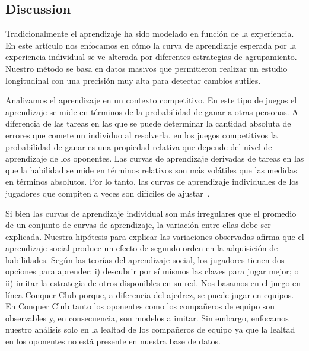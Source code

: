 \documentclass[a4paper,10pt]{book}
\theoremstyle{definition}
\begin{document}
\subsection{Discussion}

Tradicionalmente el aprendizaje ha sido modelado en funci\'on de la experiencia.
%
En este art\'iculo nos enfocamos en c\'omo la curva de aprendizaje esperada por la experiencia individual se ve alterada por diferentes estrategias de agrupamiento.
%
Nuestro método se basa en datos masivos que permitieron realizar un estudio longitudinal con una precisi\'on muy alta para detectar cambios sutiles.


Analizamos el aprendizaje en un contexto competitivo.
%
En este tipo de juegos el aprendizaje se mide en términos de la probabilidad de ganar a otras personas.
%
A diferencia de las tareas en las que se puede determinar la cantidad absoluta de errores que comete un individuo al resolverla, en los juegos competitivos la probabilidad de ganar es una propiedad relativa que depende del nivel de aprendizaje de los oponentes.
%
Las curvas de aprendizaje derivadas de tareas en las que la habilidad se mide en términos relativos son más volátiles que las medidas en términos absolutos.
%
Por lo tanto, las curvas de aprendizaje individuales de los jugadores que compiten a veces son dif\'iciles de ajustar~\cite{howard2014-learningCurvesChessPlayersATestOfPowerLawGenerality,gaschler2014-playingOffThePredictedLearningCurve}.


Si bien las curvas de aprendizaje individual son más irregulares que el promedio de un conjunto de curvas de aprendizaje, la variaci\'on entre ellas debe ser explicada.
%
Nuestra hip\'otesis para explicar las variaciones observadas afirma que el aprendizaje social produce un efecto de segundo orden en la adquisici\'on de habilidades.
%
Seg\'un las teor\'ias del aprendizaje social, los jugadores tienen dos opciones para aprender: i) descubrir por s\'i mismos las claves para jugar mejor; o ii) imitar la estrategia de otros disponibles en su red.
%
Nos basamos en el juego en l\'inea Conquer Club porque, a diferencia del ajedrez, se puede jugar en equipos.
%
En Conquer Club tanto los oponentes como los compañeros de equipo son observables y, en consecuencia, son modelos a imitar.
%
Sin embargo, enfocamos nuestro análisis solo en la lealtad de los compañeros de equipo ya que la lealtad en los oponentes no está presente en nuestra base de datos.
\end{document}
